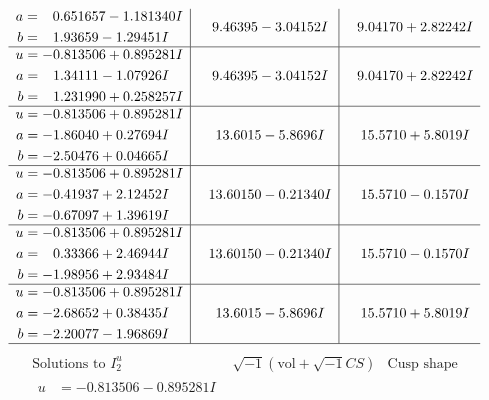 \documentclass[1p]{elsarticle_modified}
\theoremstyle{definition}
\newcommand{\I}{\sqrt{-1}}
\begin{document}
$$\begin{array}{c|c|c}
\begin{aligned}
a &= \phantom{-}0.651657 - 1.181340 I \\
b &= \phantom{-}1.93659 - 1.29451 I\end{aligned}
 & \phantom{-}9.46395 - 3.04152 I & \phantom{-}9.04170 + 2.82242 I \\ \hline\begin{aligned}
u &= -0.813506 + 0.895281 I \\
a &= \phantom{-}1.34111 - 1.07926 I \\
b &= \phantom{-}1.231990 + 0.258257 I\end{aligned}
 & \phantom{-}9.46395 - 3.04152 I & \phantom{-}9.04170 + 2.82242 I \\ \hline\begin{aligned}
u &= -0.813506 + 0.895281 I \\
a &= -1.86040 + 0.27694 I \\
b &= -2.50476 + 0.04665 I\end{aligned}
 & \phantom{-}13.6015 - 5.8696 I & \phantom{-}15.5710 + 5.8019 I \\ \hline\begin{aligned}
u &= -0.813506 + 0.895281 I \\
a &= -0.41937 + 2.12452 I \\
b &= -0.67097 + 1.39619 I\end{aligned}
 & \phantom{-}13.60150 - 0.21340 I & \phantom{-}15.5710 - 0.1570 I \\ \hline\begin{aligned}
u &= -0.813506 + 0.895281 I \\
a &= \phantom{-}0.33366 + 2.46944 I \\
b &= -1.98956 + 2.93484 I\end{aligned}
 & \phantom{-}13.60150 - 0.21340 I & \phantom{-}15.5710 - 0.1570 I \\ \hline\begin{aligned}
u &= -0.813506 + 0.895281 I \\
a &= -2.68652 + 0.38435 I \\
b &= -2.20077 - 1.96869 I\end{aligned}
 & \phantom{-}13.6015 - 5.8696 I & \phantom{-}15.5710 + 5.8019 I\\
 \hline 
 \end{array}$$\newpage$$\begin{array}{c|c|c}  
\text{Solutions to }I^u_{2}& \I (\text{vol} + \sqrt{-1}CS) & \text{Cusp shape}\\
 \hline 
\begin{aligned}
u &= -0.813506 - 0.895281 I \\

\end{aligned}
\end{array}$$
\end{document}
